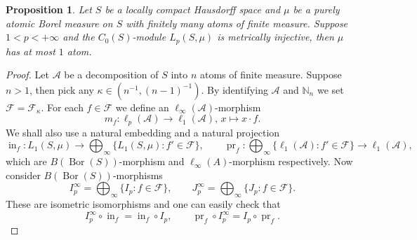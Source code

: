 \documentclass[12pt]{article}
\newtheorem{proposition}[theorem]{Proposition}
\begin{document}
\begin{proposition}\label{MetInjC0SModLpSmuOnFinAtmMeasSpCharac}
    Let $S$ be a locally compact Hausdorff space and $\mu$ be a purely atomic 
    Borel measure on $S$ with finitely many atoms of finite measure. 
    Suppose $1<p<+\infty$ and the $C_0(S)$-module $L_p(S,\mu)$ is metrically 
    injective, then $\mu$ has at most $1$ atom.
\end{proposition}
\begin{proof}
    Let $\mathcal{A}$ be a decomposition of $S$ into $n$ atoms of finite 
    measure. Suppose $n>1$, then pick any $\kappa\in(n^{-1}, (n-1)^{-1})$. 
    By identifying $\mathcal{A}$ and $\mathbb{N}_n$ we 
    set $\mathcal{F}=\mathcal{F}_{\kappa}$. For each $f\in \mathcal{F}$ 
    we define an $\ell_\infty(\mathcal{A})$-morphism 
    \[
        m_f:
        \ell_p(\mathcal{A})\to\ell_1(\mathcal{A}),\,
        x\mapsto x\cdot f.
    \]
    We shall also use a natural embedding and a natural projection
    \[
        \operatorname{in}_f:
        L_1(S,\mu)\to\bigoplus_\infty\{L_1(S,\mu):f'\in\mathcal{F}\},
        \qquad
        \operatorname{pr}_f:
        \bigoplus_\infty\{
            \ell_1(\mathcal{A}):f'\in\mathcal{F}
        \}\to\ell_1(\mathcal{A}),
    \]
    which are $B(\operatorname{Bor}(S))$-morphism 
    and $\ell_\infty(A)$-morphism respectively. 
    Now consider $B(\operatorname{Bor}(S))$-morphisms 
    \[
        I_p^\infty=\bigoplus_\infty\{I_p:f\in\mathcal{F}\},
        \qquad
        J_p^\infty=\bigoplus_\infty\{J_p:f\in\mathcal{F}\}.
    \]
    These are isometric isomorphisms and one can easily check that 
    \[
        I_p^\infty \circ \operatorname{in}_f=\operatorname{in}_f\circ I_p,
        \qquad 
        \operatorname{pr}_f\circ I_p^\infty=I_p\circ \operatorname{pr}_f.
    \]


\end{proof}
\end{document}
